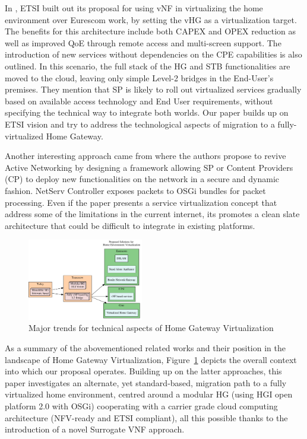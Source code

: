 In \cite{_network_2013}, ETSI built out its proposal for using vNF in virtualizing the home environment over Eurescom work, by setting the vHG as a virtualization target.
The benefits for this architecture include both CAPEX and OPEX reduction as well as improved QoE through remote access and multi-screen support.
The introduction of new services without dependencies on the CPE capabilities is also outlined.
In this scenario, the full stack of the HG and STB functionalities are moved to the cloud, leaving only simple Level-2 bridges in the End-User's premises.
They mention that SP is likely to roll out virtualized services gradually based on available access technology and End User requirements, without specifying the technical way to integrate both worlds.
Our paper builds up on ETSI vision and try to address the technological aspects of migration to a fully-virtualized Home Gateway.


Another interesting approach came from \cite{lee_netserv:_2011} where the authors  propose to revive Active Networking by designing a framework allowing SP or Content Providers (CP) to deploy new functionalities on the network in a secure and dynamic fashion.
NetServ Controller exposes packets to OSGi bundles for packet processing. Even if the paper presents a service virtualization concept that address some of the limitations in the current internet, its promotes a clean slate  architecture that could be difficult to integrate in existing platforms.

\begin{figure}
  \begin{center}
    \includegraphics[width=0.45\textwidth]{fig/vhgtrends.pdf}
  \end{center}
  \caption{ Major trends for technical aspects of Home Gateway Virtualization
    \label{fig:trends}
  }
\end{figure}	
As a summary of the abovementioned related works and their position in the landscape of Home Gateway Virtualization, Figure~\ref{fig:trends} depicts the overall context into which our proposal operates.
Building up on the latter approaches, this paper investigates an alternate, yet standard-based, migration path to a fully virtualized home environment, centred around a modular HG (using HGI open platform 2.0 with OSGi) cooperating with a carrier grade cloud computing architecture (NFV-ready and ETSI compliant), all this possible thanks to the introduction of a novel Surrogate VNF approach.




